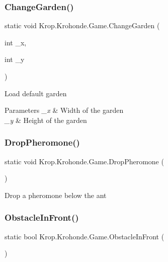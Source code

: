 \subsubsection{\texorpdfstring{Change\+Garden()}{ChangeGarden()}\hspace{0.1cm}{\footnotesize\ttfamily [2/2]}}
{\footnotesize\ttfamily static void Krop.\+Krohonde.\+Game.\+Change\+Garden (\begin{DoxyParamCaption}\item[{int}]{\+\_\+x,  }\item[{int}]{\+\_\+y }\end{DoxyParamCaption})\hspace{0.3cm}{\ttfamily [static]}}



Load default garden 


\begin{DoxyParams}{Parameters}
{\em \+\_\+x} & Width of the garden\\
\hline
{\em \+\_\+y} & Height of the garden\\
\hline
\end{DoxyParams}
\mbox{\label{class_krop_1_1_krohonde_1_1_game_a4d1fe0a45ef3e7ef8600a3ccef1289b0}} 
\subsubsection{\texorpdfstring{Drop\+Pheromone()}{DropPheromone()}}
{\footnotesize\ttfamily static void Krop.\+Krohonde.\+Game.\+Drop\+Pheromone (\begin{DoxyParamCaption}{ }\end{DoxyParamCaption})\hspace{0.3cm}{\ttfamily [static]}}



Drop a pheromone below the ant 

\mbox{\label{class_krop_1_1_krohonde_1_1_game_a4eef675c83400a1028687124abc72406}} 
\subsubsection{\texorpdfstring{Obstacle\+In\+Front()}{ObstacleInFront()}}
{\footnotesize\ttfamily static bool Krop.\+Krohonde.\+Game.\+Obstacle\+In\+Front (\begin{DoxyParamCaption}{ }\end{DoxyParamCaption})\hspace{0.3cm}{\ttfamily [static]}}



